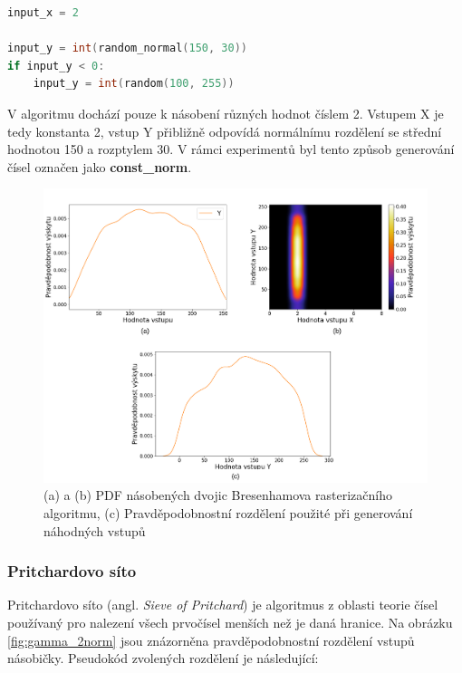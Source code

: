 \begin{lstlisting}[language={C}, label={lst:bresenham}]
input_x = 2

input_y = int(random_normal(150, 30))
if input_y < 0:
    input_y = int(random(100, 255))
\end{lstlisting}

V algoritmu dochází pouze k násobení různých hodnot číslem 2. Vstupem X je tedy konstanta 2, vstup Y přibližně odpovídá normálnímu rozdělení se střední hodnotou 150 a rozptylem 30. V rámci experimentů byl tento způsob generování čísel označen jako \textbf{const\_norm}.

\begin{figure}[H]
    \centering
    \includegraphics[width=\textwidth]{obrazky-figures/const_norm_all.png}
    \caption{(a) a (b) PDF násobených dvojic Bresenhamova rasterizačního algoritmu, (c) Pravděpodobnostní rozdělení použité při generování náhodných vstupů}
    \label{fig:const_norm}
\end{figure}

\pagebreak

\subsubsection{Pritchardovo síto}
Pritchardovo síto (angl. \textit{Sieve of Pritchard}) je algoritmus z oblasti teorie čísel používaný pro nalezení všech prvočísel menších než je daná hranice. Na obrázku \ref{fig:gamma_2norm} jsou znázorněna pravděpodobnostní rozdělení vstupů násobičky. Pseudokód zvolených rozdělení je následující:

